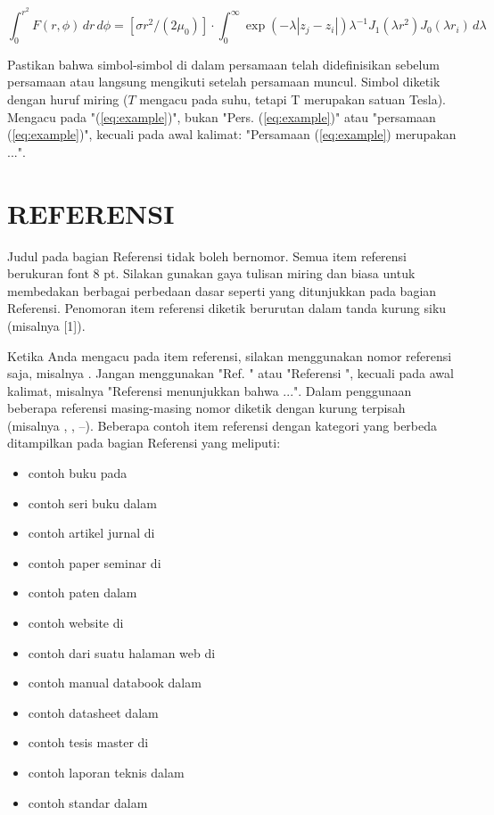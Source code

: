 \documentclass[10pt,twocolumn]{article}
\begin{document}
\begin{equation}
\int_0^{r^2} F(r,\phi) \, dr \, d\phi = [\sigma r^2/(2\mu_0)] \cdot \int_0^{\infty} \exp(-\lambda|z_j - z_i|) \lambda^{-1} J_1(\lambda r^2) J_0(\lambda r_i) \, d\lambda
\label{eq:example}
\end{equation}

Pastikan bahwa simbol-simbol di dalam persamaan telah didefinisikan sebelum persamaan atau langsung mengikuti setelah persamaan muncul. Simbol diketik dengan huruf miring ($T$ mengacu pada suhu, tetapi T merupakan satuan Tesla). Mengacu pada "(\ref{eq:example})", bukan "Pers. (\ref{eq:example})" atau "persamaan (\ref{eq:example})", kecuali pada awal kalimat: "Persamaan (\ref{eq:example}) merupakan ...".

\section{\MakeUppercase{Referensi}}
Judul pada bagian Referensi tidak boleh bernomor. Semua item referensi berukuran font 8 pt. Silakan gunakan gaya tulisan miring dan biasa untuk membedakan berbagai perbedaan dasar seperti yang ditunjukkan pada bagian Referensi. Penomoran item referensi diketik berurutan dalam tanda kurung siku (misalnya [1]).

Ketika Anda mengacu pada item referensi, silakan menggunakan nomor referensi saja, misalnya \cite{metev1998}. Jangan menggunakan "Ref. \cite{breckling1989}" atau "Referensi \cite{zhang1999}", kecuali pada awal kalimat, misalnya "Referensi \cite{zhang1999} menunjukkan bahwa ...". Dalam penggunaan beberapa referensi masing-masing nomor diketik dengan kurung terpisah (misalnya \cite{metev1998}, \cite{breckling1989}, \cite{zhang1999}--\cite{shell2002}). Beberapa contoh item referensi dengan kategori yang berbeda ditampilkan pada bagian Referensi yang meliputi:
\begin{itemize}
\item contoh buku pada \cite{metev1998}
\item contoh seri buku dalam \cite{breckling1989}
\item contoh artikel jurnal di \cite{zhang1999}
\item contoh paper seminar di \cite{wegmuller2000}
\item contoh paten dalam \cite{sorace1997}
\item contoh website di \cite{ieee2002}
\item contoh dari suatu halaman web di \cite{shell2002}
\item contoh manual databook dalam \cite{flexchip1996}
\item contoh datasheet dalam \cite{pdca1999}
\item contoh tesis master di \cite{karnik1999}
\item contoh laporan teknis dalam \cite{padhye1999}
\item contoh standar dalam \cite{ieee8021997}
\end{itemize}
\end{document}
